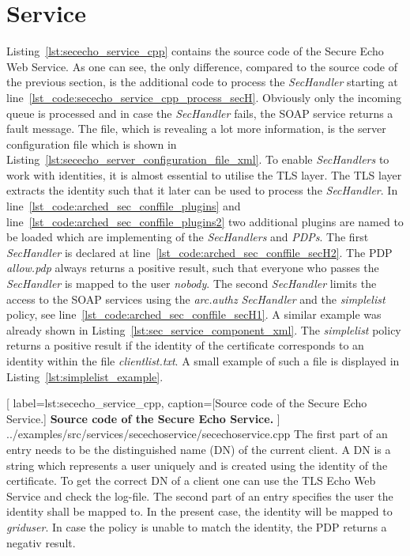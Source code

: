 \section{Service}

Listing~\ref{lst:sececho_service_cpp} contains the source code of the Secure Echo Web Service. As one can see, the only difference, compared to the source code of the previous section, is the additional code to process the \textit{SecHandler} starting at line~\ref{lst_code:sececho_service_cpp_process_secH}. Obviously only the incoming queue is processed and in case the \textit{SecHandler} fails, the SOAP service returns a fault message. The file, which is revealing a lot more information, is the server configuration file which is shown in Listing~\ref{lst:sececho_server_configuration_file_xml}. 
To enable \textit{SecHandlers} to work with identities, it is almost essential to utilise the TLS layer.
The TLS layer extracts the identity such that it later can be used to process the \textit{SecHandler}.
In line~\ref{lst_code:arched_sec_conffile_plugins} and line~\ref{lst_code:arched_sec_conffile_plugins2} two additional plugins 
are named to be loaded which are implementing of the \textit{SecHandlers} and \textit{PDPs}.
%
%
The first \textit{SecHandler} is declared at line~\ref{lst_code:arched_sec_conffile_secH2}. 
The PDP \textit{allow.pdp} always returns a positive result, such that everyone who passes the \textit{SecHandler} is mapped to the user \textit{nobody}. 
%
%
The second \textit{SecHandler} limits the access to the SOAP services using the \textit{arc.authz} \textit{SecHandler} and the \textit{simplelist} policy, see line~\ref{lst_code:arched_sec_conffile_secH1}. A similar example was already shown in Listing~\ref{lst:sec_service_component_xml}. The \textit{simplelist} policy returns a positive result if the identity of the certificate corresponds to an identity within the file \textit{clientlist.txt}. A small example of such a file is displayed in Listing~\ref{lst:simplelist_example}.

	[
	label=lst:sececho_service_cpp,
	caption={[Source code of the Secure Echo Service.]
	\textbf{Source code of the Secure Echo Service.}}
	]
{../examples/src/services/secechoservice/secechoservice.cpp}
%
%
The first part of an entry needs to be the distinguished name (DN) of the current client. A DN is a string which represents a user uniquely and is created using the identity of the certificate. To get the correct DN of a client one can use the TLS Echo Web Service and check the log-file. The second part of an entry specifies the user the identity shall be mapped to. In the present case, the identity will be mapped to \textit{griduser}. In case the policy is unable to match the identity, the PDP returns a negativ result.
